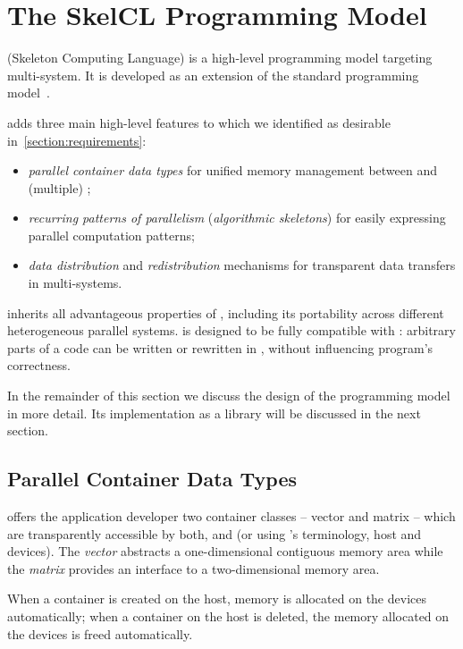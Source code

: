 \section{The SkelCL Programming Model}
\label{section:skelcl-programming-model}
\SkelCL (Skeleton Computing Language) is a high-level programming model targeting multi-\GPU system.
It is developed as an extension of the standard \OpenCL programming model~\cite{OpenCL}.

\SkelCL adds three main high-level features to \OpenCL which we identified as desirable in~\autoref{section:requirements}:

\begin{itemize}
  \item \emph{parallel container data types} for unified memory management between \CPU and (multiple) \GPUs;
  \item \emph{recurring patterns of parallelism} (\aka \emph{algorithmic skeletons}) for easily expressing parallel computation patterns;
  \item \emph{data distribution} and \emph{redistribution} mechanisms for transparent data transfers in multi-\GPU systems.
\end{itemize}

\noindent
\SkelCL inherits all advantageous properties of \OpenCL, including its portability across different heterogeneous parallel systems.
\SkelCL is designed to be fully compatible with \OpenCL: arbitrary parts of a \SkelCL code can be written or rewritten in \OpenCL, without influencing program's correctness.

In the remainder of this section we discuss the design of the \SkelCL programming model in more detail.
Its implementation as a \Cpp library will be discussed in the next section.

\subsection{Parallel Container Data Types}
\label{section:skelcl-programming-model:container}
\SkelCL offers the application developer two container classes -- vector and matrix -- which are transparently accessible by both, \CPU and \GPUs (or using \OpenCL's terminology, host and devices).
The \emph{vector} abstracts a one-dimensional contiguous memory area while the \emph{matrix} provides an interface to a two-dimensional memory area.

When a container is created on the host, memory is allocated on the devices automatically;
when a container on the host is deleted, the memory allocated on the devices is freed automatically.


